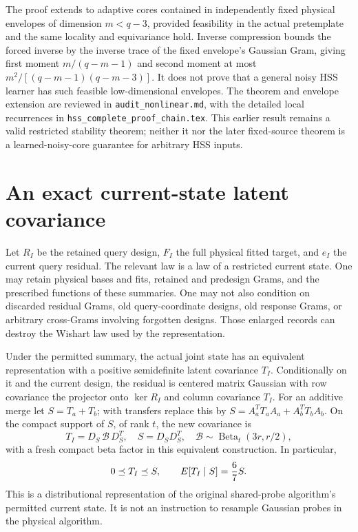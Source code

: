 \documentclass[11pt,oneside,openany,a4paper]{report}
\numberwithin{equation}{chapter}
\theoremstyle{definition}
\theoremstyle{remark}
\newcommand{\sourcefile}[1]{{\small\nolinkurl{#1}}}
\begin{document}
The proof extends to adaptive cores contained in independently fixed
physical envelopes of dimension $m<q-3$, provided feasibility in the
actual pretemplate and the same locality and equivariance hold.  Inverse
compression bounds the forced inverse by the inverse trace of the
fixed envelope's Gaussian Gram, giving first moment
$m/(q-m-1)$ and second moment at most
$m^2/[(q-m-1)(q-m-3)]$.  It does not prove that a general noisy HSS
learner has such feasible low-dimensional envelopes.  The theorem and
envelope extension are reviewed in \sourcefile{audit_nonlinear.md},
with the detailed local recurrences in
\sourcefile{hss_complete_proof_chain.tex}.  This earlier result remains
a valid restricted stability theorem; neither it nor the later
fixed-source theorem is a learned-noisy-core guarantee for arbitrary
HSS inputs.

\section{An exact current-state latent covariance}

Let $R_I$ be the retained query design, $F_I$ the full physical fitted
target, and $e_I$ the current query residual.  The relevant law is a
law of a restricted current state.  One may retain physical bases and
fits, retained and predesign Grams, and the prescribed functions of
these summaries.  One may not also condition on discarded residual
Grams, old query-coordinate designs, old response Grams, or arbitrary
cross-Grams involving forgotten designs.  Those enlarged records can
destroy the Wishart law used by the representation.

Under the permitted summary, the actual joint state has an equivalent
representation with a positive semidefinite latent covariance $T_I$.
Conditionally on it and the current design, the residual is centered
matrix Gaussian with row covariance the projector onto
$\ker R_I$ and column covariance $T_I$.  For an additive merge let
$S=T_a+T_b$; with transfers replace this by
$S=A_a^TT_aA_a+A_b^TT_bA_b$.  On the compact support of $S$, of rank $t$,
the new covariance is
\begin{equation}
 T_I=D_S\,\mathcal B\,D_S^T,
 \quad S=D_SD_S^T,
 \quad \mathcal B\sim\operatorname{Beta}_t(3r,r/2),
 \label{eq:route-matrix-beta}
\end{equation}
with a fresh compact beta factor in this equivalent construction.
In particular,
\[
 0\preceq T_I\preceq S,\qquad
 E[T_I\mid S]=\frac67S.
\]
This is a distributional representation of the original shared-probe
algorithm's permitted current state.  It is not an instruction to
resample Gaussian probes in the physical algorithm.
\end{document}
